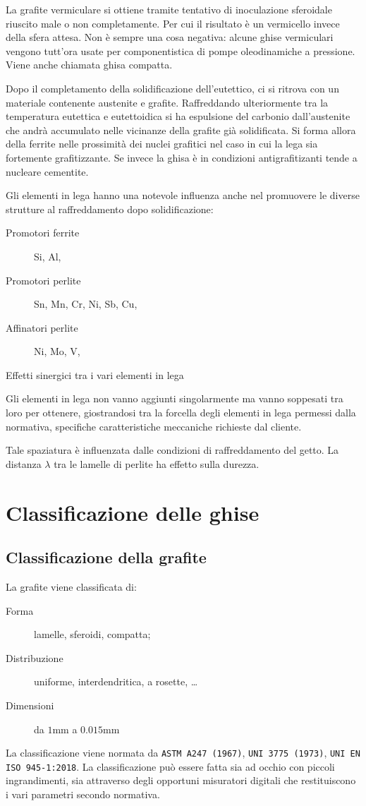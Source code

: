 La grafite vermiculare si ottiene tramite tentativo di inoculazione sferoidale riuscito male o non completamente. Per cui il risultato è un vermicello invece della sfera attesa. Non è sempre una cosa negativa: alcune ghise vermiculari vengono tutt'ora usate per componentistica di pompe oleodinamiche a pressione. Viene anche chiamata ghisa compatta.

Dopo il completamento della solidificazione dell'eutettico, ci si ritrova con un materiale contenente austenite e grafite.
Raffreddando ulteriormente tra la temperatura eutettica e eutettoidica si ha espulsione del carbonio dall'austenite che andrà accumulato nelle vicinanze della grafite già solidificata. Si forma allora della ferrite nelle prossimità dei nuclei grafitici nel caso in cui la lega sia fortemente grafitizzante. Se invece la ghisa è in condizioni antigrafitizanti tende a nucleare cementite.

Gli elementi in lega hanno una notevole influenza anche nel promuovere le diverse strutture al raffreddamento dopo solidificazione:
\begin{description}
\item[Promotori ferrite] Si, Al,
\item[Promotori perlite] Sn, Mn, Cr, Ni, Sb, Cu,
\item[Affinatori perlite] Ni, Mo, V,
\item[Effetti sinergici tra i vari elementi in lega]
\end{description}
Gli elementi in lega non vanno aggiunti singolarmente ma vanno soppesati tra loro per ottenere, giostrandosi tra la forcella degli elementi in lega permessi dalla normativa, specifiche caratteristiche meccaniche richieste dal cliente.

Tale spaziatura è influenzata dalle condizioni di raffreddamento del getto.
La distanza $\lambda$ tra le lamelle di perlite ha effetto sulla durezza.

\section{Classificazione delle ghise}
\subsection{Classificazione della grafite}
La grafite viene classificata di:
\begin{description}
\item[Forma] lamelle, sferoidi, compatta;
\item[Distribuzione] uniforme, interdendritica, a rosette, \dots
\item[Dimensioni] da $1\unit{\mm}$ a $0.015\unit{\mm}$
\end{description}
La classificazione viene normata da \texttt{ASTM A247 (1967)}, \texttt{UNI 3775 (1973)}, \texttt{UNI EN ISO 945-1:2018}.
La classificazione può essere fatta sia ad occhio con piccoli ingrandimenti, sia attraverso degli opportuni misuratori digitali che restituiscono i vari parametri secondo normativa.

